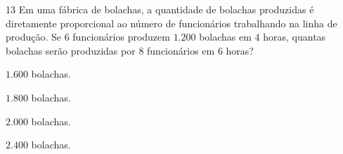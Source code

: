 

\num{13} Em uma fábrica de bolachas, a quantidade de bolachas produzidas é
diretamente proporcional ao número de funcionários trabalhando na linha
de produção. Se $6$ funcionários produzem $1.200$ bolachas em $4$ horas,
quantas bolachas serão produzidas por $8$ funcionários em $6$ horas?

\begin{escolha}
\item $1.600$ bolachas.
\item $1.800$ bolachas.
\item $2.000$ bolachas.
\item $2.400$ bolachas.
\end{escolha}




